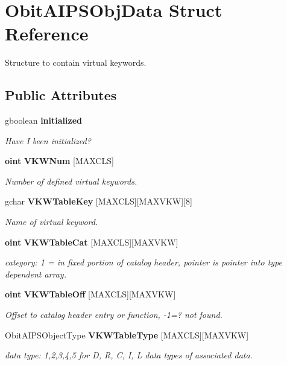 \section{Obit\-AIPSObj\-Data Struct Reference}
\label{structObitAIPSObjData}
Structure to contain virtual keywords.  


\subsection*{Public Attributes}
\begin{CompactItemize}
\item 
gboolean {\bf initialized}
\begin{CompactList}\small\item\em Have I been initialized? \item\end{CompactList}\item 
{\bf oint} {\bf VKWNum} [MAXCLS]
\begin{CompactList}\small\item\em Number of defined virtual keywords. \item\end{CompactList}\item 
gchar {\bf VKWTable\-Key} [MAXCLS][MAXVKW][8]
\begin{CompactList}\small\item\em Name of virtual keyword. \item\end{CompactList}\item 
{\bf oint} {\bf VKWTable\-Cat} [MAXCLS][MAXVKW]
\begin{CompactList}\small\item\em category: 1 = in fixed portion of catalog header, pointer is pointer into type dependent array. \item\end{CompactList}\item 
{\bf oint} {\bf VKWTable\-Off} [MAXCLS][MAXVKW]
\begin{CompactList}\small\item\em Offset to catalog header entry or function, -1=? not found. \item\end{CompactList}\item 
Obit\-AIPSObject\-Type {\bf VKWTable\-Type} [MAXCLS][MAXVKW]
\begin{CompactList}\small\item\em data type: 1,2,3,4,5 for D, R, C, I, L data types of associated data. \item\end{CompactList}\item 

\end{CompactItemize}
